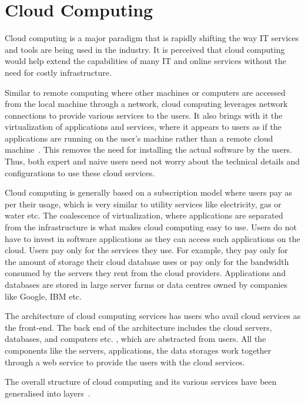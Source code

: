 \section{Cloud Computing} \label{s:cloudComputing}
Cloud computing is a major paradigm that is rapidly shifting the way \ac{IT}
services and tools are being used in the industry.  It is perceived that cloud
computing would help extend the capabilities of many \ac{IT} and online services
without the need for costly infrastructure.

Similar to remote computing where other machines or computers are accessed from
the local machine through a network,   cloud computing leverages network
connections to provide various services to the users.  It also brings with it
the virtualization of applications and services,   where it appears to users as
if the applications are running on the user's machine rather than a remote cloud
machine~\citep{cloudcomputingdefined}.  This removes the need for
installing the actual software by the users.  Thus,   both expert and naive
users need not worry about the technical details and configurations to use these
cloud services.

Cloud computing is generally based on a subscription model where users pay as
per their usage,   which is very similar to utility services like electricity,  
gas or water etc.  The coalescence of virtualization,   where applications are
separated from the infrastructure is what makes cloud computing easy to use.
Users do not have to invest in software applications as they can access such
applications on the cloud.  Users pay only for the services they use.  For
example,   they pay only for the amount of storage their cloud database uses or
pay only for the bandwidth consumed by the servers they rent from the cloud
providers.  Applications and databases are stored in large server farms or data
centres owned by companies like Google,  IBM etc.

The architecture of cloud computing services has users who avail cloud services
as the front-end.  The back end of the architecture includes the cloud servers,
databases,   and computers etc. ,   which are abstracted from users.  All the
components like the servers,   applications,   the data storages work together
through a web service to provide the users with the cloud services. 

The overall structure of cloud computing and its various services have been
generalised into layers~\citep{DeLeon,Spring1,Spring2}.

